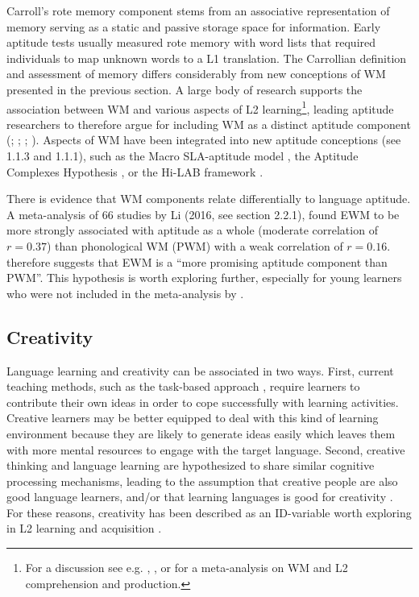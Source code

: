 \documentclass[output=paper]{langscibook}
\begin{document}
Carroll’s rote memory component stems from an associative representation of memory serving as a static and passive storage space for information. Early aptitude tests usually measured rote memory with word lists that required individuals to map unknown words to a L1 translation. The Carrollian definition and assessment of memory differs considerably from new conceptions of WM presented in the previous section. A large body of research supports the association between WM and various aspects of L2 learning\footnote{For a discussion see e.g. \citet{DeKeyserKoeth2011}, \citet{Wen2015}, or \citet{LinckEtAl2014} for a meta-analysis on WM and L2 comprehension and production.}, leading aptitude researchers to therefore argue for including WM as a distinct aptitude component (\citealt{MiyakeFriedman1998}; \citealt{DeKeyserKoeth2011}; \citealt{Robinson2002}; \citealt{Skehan2019}). Aspects of WM have been integrated into new aptitude conceptions (see 1.1.3 and 1.1.1), such as the Macro SLA-aptitude model \citep{Skehan2019}, the Aptitude Complexes Hypothesis \citep{Robinson2002}, or the Hi-LAB framework \citep{LinckEtAl2013}. 

There is evidence that WM components relate differentially to language aptitude. A meta-analysis of 66 studies by Li (2016, see section 2.2.1), found EWM to be more strongly associated with aptitude as a whole (moderate correlation of $r=0.37$) than phonological WM (PWM) with a weak correlation of $r=0.16$. \citet[828]{Li2016} therefore suggests that EWM is a “more promising aptitude component than PWM”. This hypothesis is worth exploring further, especially for young learners who were not included in the meta-analysis by \citet{Li2016}. 

\subsection{Creativity} %

Language learning and creativity can be associated in two ways. First, current teaching methods, such as the task-based approach \citep{Willis1996}, require learners to contribute their own ideas in order to cope successfully with learning activities. Creative learners may be better equipped to deal with this kind of learning environment because they are likely to generate ideas easily which leaves them with more mental resources to engage with the target language. Second, creative thinking and language learning are hypothesized to share similar cognitive processing mechanisms, leading to the assumption that creative people are also good language learners, and/or that learning languages is good for creativity \citep{Kharkhurin2012}. For these reasons, creativity has been described as an ID-variable worth exploring in L2 learning and acquisition \citep{Doernyei2005}. 
\end{document}
